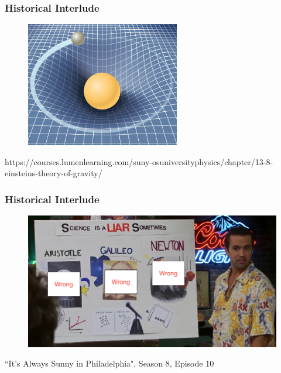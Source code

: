 \documentclass{beamer}
\begin{document}
\begin{frame}
\frametitle{Historical Interlude}

  \begin{figure}[htb!]
    \centering
    \includegraphics[width=0.6\textwidth]{fig.Einstein.jpg}
  \end{figure}
https://courses.lumenlearning.com/suny-osuniversityphysics/chapter/13-8-einsteins-theory-of-gravity/

\end{frame}

\begin{frame}
\frametitle{Historical Interlude}

  \begin{figure}[htb!]
    \centering
    \includegraphics[width=\textwidth]{fig.macEvolution.png}
  \end{figure}

\centerline{``It's Always Sunny in Philadelphia", Season 8, Episode 10}

\end{frame}
\end{document}
